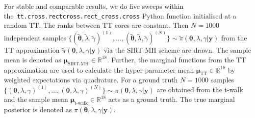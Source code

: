 For stable and comparable results, we do five sweeps within \linebreak the~\texttt{tt.cross.rectcross.rect\_cross.cross} Python function initialised at a random TT.
The ranks between TT cores are constant.
Then $N = 1000$ independent samples  $ \{( \tilde{ \bm{\theta}},  \tilde{\lambda},  \tilde{\gamma })^{(1)} ,\dots, (\tilde{ \bm{\theta}},  \tilde{\lambda},  \tilde{\gamma })^{(N)}   \} \sim \tilde{\pi}( \bm{\theta},\lambda,\gamma  | \bm{y})$ from the TT approximation $\tilde{\pi}( \bm{\theta},\lambda,\gamma  | \bm{y})$ via the SIRT-MH scheme are drawn.
The sample mean is denoted as $\bm{\mu}_{\text{SIRT-MH}}\in \mathbb{R}^{18}$.
Further, the marginal functions from the TT approximation are used to calculate the hyper-parameter mean $\bm{\mu}_{\text{TT}}\in \mathbb{R}^{18}$ by weighted expectations via quadrature.
For a ground truth $N = 1000$ samples $ \{( \bm{\theta},\lambda,\gamma )^{(1)} ,\dots,( \bm{\theta},\lambda,\gamma )^{(N)}   \} \sim \pi( \bm{\theta},\lambda,\gamma  | \bm{y})$
are obtained from the t-walk and the sample mean $ \bm{\mu}_{\text{t-walk}}  \in \mathbb{R}^{18}$ acts as a ground truth.
The true marginal posterior is denoted as $ \pi( \bm{\theta},\lambda,\gamma  | \bm{y})$.

